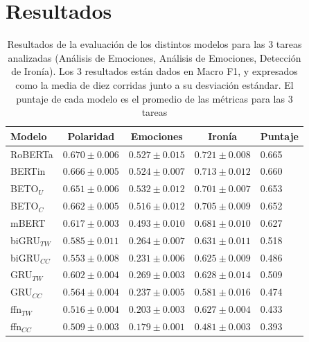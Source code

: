 \section{Resultados}

\begin{table}[t]
    \centering
    \large
    \begin{tabular}{l ccc l}
        \toprule
        Modelo         &  Polaridad         & Emociones         &   Ironía        &  Puntaje \\
        \hline
        RoBERTa        &  $0.670 \pm 0.006$ &  $0.527 \pm 0.015$& $0.721 \pm 0.008$ &  0.665 \\
        BERTin         &  $0.666 \pm 0.005$ &  $0.524 \pm 0.007$& $0.713 \pm 0.012$ &  0.660 \\
        BETO$_U$       &  $0.651 \pm 0.006$ &  $0.532 \pm 0.012$& $0.701 \pm 0.007$ &  0.653 \\
        BETO$_C$       &  $0.662 \pm 0.005$ &  $0.516 \pm 0.012$& $0.705 \pm 0.009$ &  0.652 \\
        mBERT          &  $0.617 \pm 0.003$ &  $0.493 \pm 0.010$& $0.681 \pm 0.010$ &  0.627 \\
        \hline
        biGRU$_{TW}$   &  $0.585 \pm 0.011$ &  $0.264 \pm 0.007$& $0.631 \pm 0.011$ &  0.518 \\
        biGRU$_{CC}$   &  $0.553 \pm 0.008$ &  $0.231 \pm 0.006$& $0.625 \pm 0.009$ &  0.486 \\
        GRU$_{TW}$     &  $0.602 \pm 0.004$ &  $0.269 \pm 0.003$& $0.628 \pm 0.014$ &  0.509 \\
        GRU$_{CC}$     &  $0.564 \pm 0.004$ &  $0.237 \pm 0.005$& $0.581 \pm 0.016$ &  0.474 \\
        ffn$_{TW}$     &  $0.516 \pm 0.004$ &  $0.203 \pm 0.003$& $0.627 \pm 0.004$ &  0.433 \\
        ffn$_{CC}$     &  $0.509 \pm 0.003$ &  $0.179 \pm 0.001$& $0.481 \pm 0.003$ &  0.393 \\
        \hline
    \end{tabular}
    \caption{Resultados de la evaluación de los distintos modelos para las 3 tareas analizadas (Análisis de Emociones, Análisis de Emociones, Detección de Ironía). Los 3 resultados están dados en Macro F1, y expresados como la media de diez corridas junto a su desviación estándar. El puntaje de cada modelo es el promedio de las métricas para las 3 tareas}
    \label{tab:03_classification_results}
\end{table}

